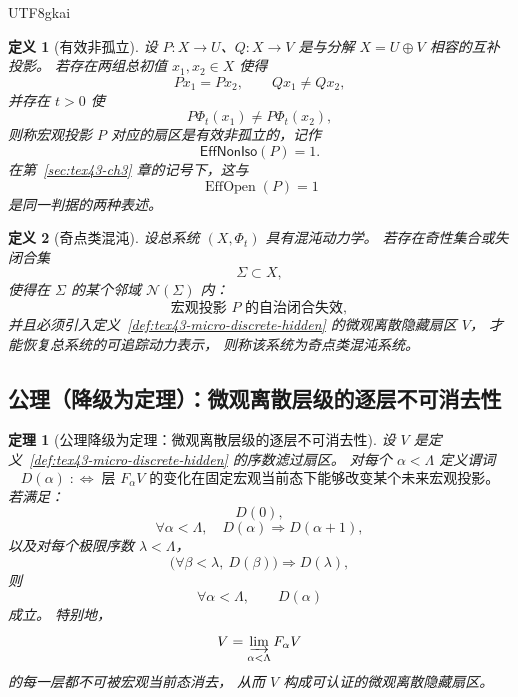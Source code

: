 \documentclass[12pt]{article}
\newtheorem{definition}{定义}[section]
\newtheorem{theorem}{定理}[section]
\newcommand{\EffOpen}{\operatorname{EffOpen}}
\begin{document}
\begin{CJK*}{UTF8}{gkai}
\begin{definition}[有效非孤立]
\label{def:tex43-effective-nonisolation}
设 $P:X\to U$、$Q:X\to V$ 是与分解 $X=U\oplus V$ 相容的互补投影。
若存在两组总初值 $x_1,x_2\in X$ 使得
\[
  Px_1=Px_2,
  \qquad
  Qx_1\neq Qx_2,
\]
并存在 $t>0$ 使
\[
  P\Phi_t(x_1)\neq P\Phi_t(x_2),
\]
则称宏观投影 $P$ 对应的扇区是\emph{有效非孤立}的，记作
\[
  \mathsf{EffNonIso}(P)=1.
\]
在第~\ref{sec:tex43-ch3} 章的记号下，这与
\[
  \EffOpen(P)=1
\]
是同一判据的两种表述。
\end{definition}

\begin{definition}[奇点类混沌]
\label{def:tex43-singularity-chaos}
设总系统 $(X,\Phi_t)$ 具有混沌动力学。
若存在奇性集合或失闭合集
\[
  \Sigma\subset X,
\]
使得在 $\Sigma$ 的某个邻域 $\mathcal N(\Sigma)$ 内：
\[
  \text{宏观投影 }P\text{ 的自治闭合失效},
\]
并且必须引入定义~\ref{def:tex43-micro-discrete-hidden} 的微观离散隐藏扇区 $V$，
才能恢复总系统的可追踪动力表示，
则称该系统为\emph{奇点类混沌系统}。
\end{definition}

\subsection{公理（降级为定理）：微观离散层级的逐层不可消去性}
\label{subsec:tex43-ch5-axiom-downgrade}

\begin{theorem}[公理降级为定理：微观离散层级的逐层不可消去性]
\label{thm:tex43-discrete-hidden-induction}
设 $V$ 是定义~\ref{def:tex43-micro-discrete-hidden} 的序数滤过扇区。
对每个 $\alpha<\Lambda$ 定义谓词
\[
  D(\alpha)
  \;:\Longleftrightarrow\;
  \text{层 }F_\alpha V\text{ 的变化在固定宏观当前态下能够改变某个未来宏观投影。}
\]
若满足：
\[
  D(0),
\]
\[
  \forall \alpha<\Lambda,\quad D(\alpha)\Rightarrow D(\alpha+1),
\]
以及对每个极限序数 $\lambda<\Lambda$，
\[
  \Big(\forall \beta<\lambda,\ D(\beta)\Big)\Rightarrow D(\lambda),
\]
则
\[
  \forall \alpha<\Lambda,\qquad D(\alpha)
\]
成立。
特别地，
\[
  V=\varinjlim_{\alpha<\Lambda}F_\alpha V
\]
的每一层都不可被宏观当前态消去，
从而 $V$ 构成可认证的微观离散隐藏扇区。
\end{theorem}


\end{CJK*}
\end{document}
